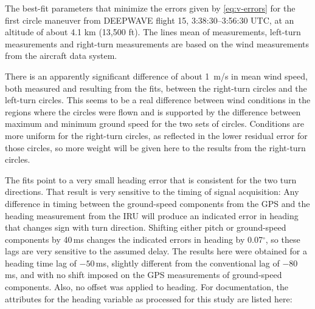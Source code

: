 \documentclass[12pt,twoside,english]{article}\usepackage[]{graphicx}\usepackage[]{color}
\let\OrgIndex\index
\renewcommand*{\index}[1]{\OrgIndex{#1}}
\begin{document}
{{\begin{center}
\begin{table}[H]
\protect\caption[The best-fit parameters that minimize the errors given by \eqref{eq:v-errors} for the first circle maneuver from DEEPWAVE flight 15.]{The best-fit parameters that minimize the errors given by \eqref{eq:v-errors} for the first circle maneuver from DEEPWAVE flight 15, 3:38:30--3:56:30 UTC, at an altitude of about 4.1 km (13,500 ft). The lines \textquotedbl{}mean of measurements\textquotedbl{}, \textquotedbl{}left-turn measurements\textquotedbl{} and \textquotedbl{}right-turn measurements\textquotedbl{} are based on the wind measurements from the aircraft data system.\label{tab:GSmin}}
\end{table}

\par\end{center}

There is an apparently significant difference of about 1~m/s in mean wind speed, both measured and resulting from the fits, between the right-turn circles and the left-turn circles. This seems to be a real difference between wind conditions in the regions where the circles were flown and is supported by the difference between maximum and minimum ground speed for the two sets of circles. Conditions are more uniform for the right-turn circles, as reflected in the lower residual error for those circles, so more weight will be given here to the results from the right-turn circles. 

The fits point to a very small heading error that is consistent for the two turn directions. That result is very sensitive to the timing of signal acquisition: Any difference in timing between the ground-speed components from the GPS and the heading measurement from the IRU will produce an indicated error in heading that changes sign with turn direction. Shifting either pitch or ground-speed components by 40\,ms changes the indicated errors in heading by 0.07$^{\circ}$, so these lags are very sensitive to the assumed delay. The results here were obtained for a heading time lag of $-50$\,ms, slightly different from the conventional lag of $-80$\,ms, and with no shift imposed on the GPS measurements of ground-speed components. Also, no offset was applied to heading. For documentation, the attributes for the heading variable as processed for this study are listed here: 

}}
\end{document}
